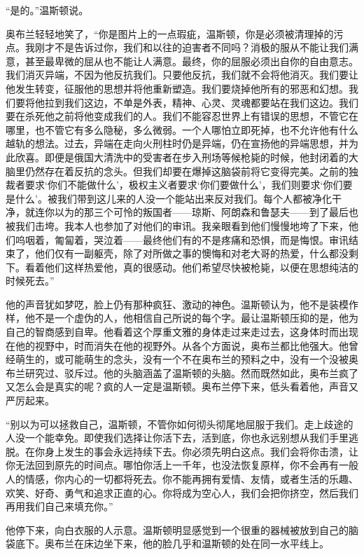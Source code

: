 ``是的。''温斯顿说。

奥布兰轻轻地笑了，``你是图片上的一点瑕疵，温斯顿，你是必须被清理掉的污点。我刚才不是告诉过你，我们和以往的迫害者不同吗？消极的服从不能让我们满意，甚至最卑微的屈从也不能让人满意。最终，你的屈服必须出自你的自由意志。我们消灭异端，不因为他反抗我们。只要他反抗，我们就不会将他消灭。我们要让他发生转变，征服他的思想并将他重新塑造。我们要烧掉他所有的邪恶和幻想。我们要将他拉到我们这边，不单是外表，精神、心灵、灵魂都要站在我们这边。我们要在杀死他之前将他变成我们的人。我们不能容忍世界上有错误的思想，不管它在哪里，也不管它有多么隐秘，多么微弱。一个人哪怕立即死掉，也不允许他有什么越轨的想法。过去，异端在走向火刑柱时仍是异端，仍在宣扬他的异端思想，并为此欣喜。即便是俄国大清洗中的受害者在步入刑场等候枪毙的时候，他封闭着的大脑里仍然存在着反抗的念头。但我们却要在爆掉这脑袋前将它变得完美。之前的独裁者要求`你们不能做什么'，极权主义者要求`你们要做什么'，我们则要求`你们要是什么'。被我们带到这儿来的人没一个能站出来反对我们。每个人都被净化干净，就连你以为的那三个可怜的叛国者------琼斯、阿朗森和鲁瑟夫------到了最后也被我们击垮。我本人也参加了对他们的审讯。我亲眼看到他们慢慢地垮了下来，他们呜咽着，匍匐着，哭泣着------最终他们有的不是疼痛和恐惧，而是悔恨。审讯结束了，他们仅有一副躯壳，除了对所做之事的懊悔和对老大哥的热爱，什么都没剩下。看着他们这样热爱他，真的很感动。他们希望尽快被枪毙，以便在思想纯洁的时候死去。''

他的声音犹如梦呓，脸上仍有那种疯狂、激动的神色。温斯顿认为，他不是装模作样，他不是一个虚伪的人，他相信自己所说的每个字。最让温斯顿压抑的是，他为自己的智商感到自卑。他看着这个厚重文雅的身体走过来走过去，这身体时而出现在他的视野中，时而消失在他的视野外。从各个方面说，奥布兰都比他强大。他曾经萌生的，或可能萌生的念头，没有一个不在奥布兰的预料之中，没有一个没被奥布兰研究过、驳斥过。他的头脑涵盖了温斯顿的头脑。然而既然如此，奥布兰疯了又怎么会是真实的呢？疯的人一定是温斯顿。奥布兰停下来，低头看着他，声音又严厉起来。

``别以为可以拯救自己，温斯顿，不管你如何彻头彻尾地屈服于我们。走上歧途的人没一个能幸免。即使我们选择让你活下去，活到底，你也永远别想从我们手里逃脱。在你身上发生的事会永远持续下去。你必须先明白这点。我们会将你击溃，让你无法回到原先的时间点。哪怕你活上一千年，也没法恢复原样，你不会再有一般人的情感，你内心的一切都将死去。你不能再拥有爱情、友情，或者生活的乐趣、欢笑、好奇、勇气和追求正直的心。你将成为空心人，我们会把你挤空，然后我们再用我们自己来填充你。''

他停下来，向白衣服的人示意。温斯顿明显感觉到一个很重的器械被放到自己的脑袋底下。奥布兰在床边坐下来，他的脸几乎和温斯顿的处在同一水平线上。

